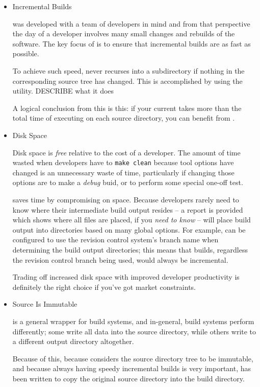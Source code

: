 \begin{itemize}
\item Incremental Builds

  \lmsbw was developed with a team of developers in mind and from that
  perspective the day of a developer involves many small changes and
  rebuilds of the software.  The key focus of \lmsbw is to ensure that
  incremental builds are as fast as possible.

  To achieve such speed, \lmsbw never recurses into a subdirectory if
  nothing in the corresponding source tree has changed.  This is
  accomplished by using the \mtree utility.  DESCRIBE what it does

   A logical conclusion from this
  is this: if your current \nullbuild takes more than the total time
  of executing \mtree on each source directory, you can benefit from
  \lmsbw.

\item Disk Space

  Disk space is \emph{free} relative to the cost of a developer.  The
  amount of time wasted when developers have to \texttt{make clean}
  because tool options have changed is an unnecessary waste of time,
  particularly if changing those options are to make a \emph{debug}
  buid, or to perform some special one-off test.

  \lmsbw saves time by compromising on space.  Because developers
  rarely need to know where their intermediate build output resides --
  a report is provided which shows where all files are placed, if you
  \emph{need to know} -- \lmsbw will place build output into
  directories based on many global options.  For example, \lmsbw can
  be configured to use the revision control system's branch name when
  determining the build output directories; this means that builds,
  regardless the revision control branch being used, would always be
  incremental.

  Trading off increased disk space with improved developer
  productivity is definitely the right choice if you've got market
  constraints.

\item Source Is Immutable

  \lmsbw is a general wrapper for build systems, and in-general, build
  systems perform differently; some write all data into the source
  directory, while others write to a different output directory
  altogether.

  Because of this, because \lmsbw considers the source directory tree
  to be immutable, and because always having speedy incremental builds
  is very important, \lmsbw has been written to copy the original
  source directory into the build directory.


\end{itemize}
